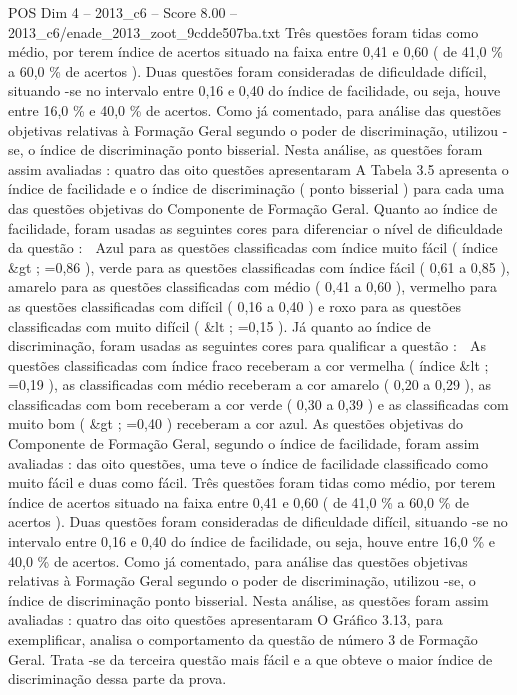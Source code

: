 \begin{textsample}{POS Dim 4 – 2013\_c6 – Score 8.00 – 2013\_c6/enade\_2013\_zoot\_9cdde507ba.txt}
Três questões foram tidas como médio, por terem índice de acertos situado na faixa entre 0,41 e 0,60 ( de 41,0 \% a 60,0 \% de acertos ).
Duas questões foram consideradas de dificuldade difícil, situando -se no intervalo entre 0,16 e 0,40 do índice de facilidade, ou seja, houve entre 16,0 \% e 40,0 \% de acertos.
Como já comentado, para análise das questões objetivas relativas à Formação Geral segundo o poder de discriminação, utilizou -se, o índice de discriminação ponto bisserial.
Nesta análise, as questões foram assim avaliadas : quatro das oito questões apresentaram A Tabela 3.5 apresenta o índice de facilidade e o índice de discriminação ( ponto bisserial ) para cada uma das questões objetivas do Componente de Formação Geral.
Quanto ao índice de facilidade, foram usadas as seguintes cores para diferenciar o nível de dificuldade da questão :  Azul para as questões classificadas com índice muito fácil ( índice \&gt ; =0,86 ), verde para as questões classificadas com índice fácil ( 0,61 a 0,85 ), amarelo para as questões classificadas com médio ( 0,41 a 0,60 ), vermelho para as questões classificadas com difícil ( 0,16 a 0,40 ) e roxo para as questões classificadas com muito difícil ( \&lt ; =0,15 ).
Já quanto ao índice de discriminação, foram usadas as seguintes cores para qualificar a questão :  As questões classificadas com índice fraco receberam a cor vermelha ( índice \&lt ; =0,19 ), as classificadas com médio receberam a cor amarelo ( 0,20 a 0,29 ), as classificadas com bom receberam a cor verde ( 0,30 a 0,39 ) e as classificadas com muito bom ( \&gt ; =0,40 ) receberam a cor azul.
As questões objetivas do Componente de Formação Geral, segundo o índice de facilidade, foram assim avaliadas : das oito questões, uma teve o índice de facilidade classificado como muito fácil e duas como fácil.
Três questões foram tidas como médio, por terem índice de acertos situado na faixa entre 0,41 e 0,60 ( de 41,0 \% a 60,0 \% de acertos ).
Duas questões foram consideradas de dificuldade difícil, situando -se no intervalo entre 0,16 e 0,40 do índice de facilidade, ou seja, houve entre 16,0 \% e 40,0 \% de acertos.
Como já comentado, para análise das questões objetivas relativas à Formação Geral segundo o poder de discriminação, utilizou -se, o índice de discriminação ponto bisserial.
Nesta análise, as questões foram assim avaliadas : quatro das oito questões apresentaram O Gráfico 3.13, para exemplificar, analisa o comportamento da questão de número 3 de Formação Geral.
Trata -se da terceira questão mais fácil e a que obteve o maior índice de discriminação dessa parte da prova.

\end{textsample}
